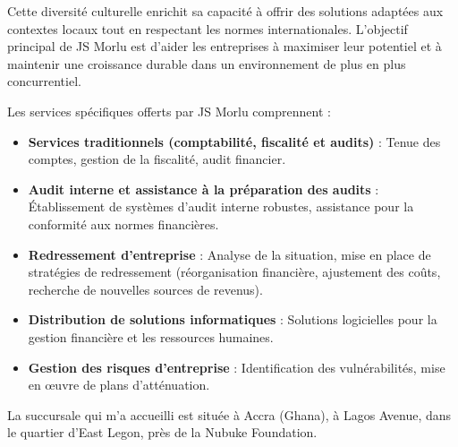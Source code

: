 \vspace{0.5cm}

Cette diversité culturelle enrichit sa capacité à offrir des solutions adaptées aux contextes locaux tout en respectant les normes internationales. L'objectif principal de JS Morlu est d'aider les entreprises à maximiser leur potentiel et à maintenir une croissance durable dans un environnement de plus en plus concurrentiel.

\vspace{0.5cm}

Les services spécifiques offerts par JS Morlu comprennent :

\vspace{0.3cm}

\begin{itemize}
    \item \textbf{Services traditionnels (comptabilité, fiscalité et audits)} : Tenue des comptes, gestion de la fiscalité, audit financier.

\vspace{0.3cm}

\item \textbf{Audit interne et assistance à la préparation des audits} :
Établissement de systèmes d'audit interne robustes, assistance pour la conformité aux normes financières.

\vspace{0.3cm}

\item \textbf{Redressement d'entreprise} :
Analyse de la situation, mise en place de stratégies de redressement (réorganisation financière, ajustement des coûts, recherche de nouvelles sources de revenus).

\vspace{0.3cm}

\item \textbf{Distribution de solutions informatiques} :
Solutions logicielles pour la gestion financière et les ressources humaines.

\vspace{0.3cm}

\item \textbf{Gestion des risques d'entreprise} :
Identification des vulnérabilités, mise en œuvre de plans d'atténuation.

\end{itemize}

\vspace{0.5cm}

La succursale qui m'a accueilli est située à Accra (Ghana), à Lagos Avenue, dans le quartier d'East Legon, près de la Nubuke Foundation. 

